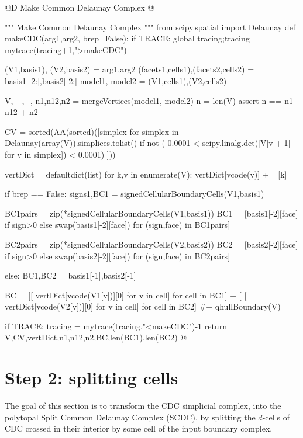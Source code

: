 \documentclass[11pt,oneside]{article}	%
\begin{document}
	
@D Make Common Delaunay Complex
@{""" Make Common Delaunay Complex """
from scipy.spatial import Delaunay
def makeCDC(arg1,arg2, brep=False):
	if TRACE: global tracing;tracing = mytrace(tracing+1,">makeCDC")


	(V1,basis1), (V2,basis2) = arg1,arg2
	(facets1,cells1),(facets2,cells2) = basis1[-2:],basis2[-2:]
	model1, model2 = (V1,cells1),(V2,cells2)

	V, _,_, n1,n12,n2 = mergeVertices(model1, model2)
	n = len(V)
	assert n == n1 - n12 + n2
	
	CV = sorted(AA(sorted)([simplex for simplex in Delaunay(array(V)).simplices.tolist() 
		if not (-0.0001 < scipy.linalg.det([V[v]+[1] for v in simplex]) < 0.0001) ]))
	
	vertDict = defaultdict(list)
	for k,v in enumerate(V): vertDict[vcode(v)] += [k]
	
	if brep == False:
		signs1,BC1 = signedCellularBoundaryCells(V1,basis1)
		
		BC1pairs = zip(*signedCellularBoundaryCells(V1,basis1))
		BC1 = [basis1[-2][face] if sign>0 else swap(basis1[-2][face]) for (sign,face) in BC1pairs]
	
		BC2pairs = zip(*signedCellularBoundaryCells(V2,basis2))
		BC2 = [basis2[-2][face] if sign>0 else swap(basis2[-2][face]) for (sign,face) in BC2pairs] 

	else:
		BC1,BC2 = basis1[-1],basis2[-1]
	
	BC = [[ vertDict[vcode(V1[v])][0] for v in cell] for cell in BC1] + [ 
			[ vertDict[vcode(V2[v])][0] for v in cell] for cell in BC2] #+ qhullBoundary(V)
		

	if TRACE: tracing = mytrace(tracing,"<makeCDC")-1
	return V,CV,vertDict,n1,n12,n2,BC,len(BC1),len(BC2)
@}




\section{Step 2: splitting cells}

The goal of this section is to transform the CDC simplicial complex, into the polytopal Split Common Delaunay Complex (SCDC), by splitting the $d$-cells of CDC crossed in their interior by some cell of the input boundary complex.
\end{document}
